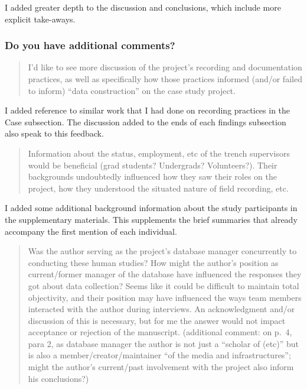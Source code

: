 \documentclass[
]{article}
\begin{document}
I added greater depth to the discussion and conclusions, which include
more explicit take-aways.

\subsubsection{Do you have additional
comments?}\label{do-you-have-additional-comments-2}

\begin{quote}
I'd like to see more discussion of the project's recording and
documentation practices, as well as specifically how those practices
informed (and/or failed to inform) ``data construction'' on the case
study project.
\end{quote}

I added reference to similar work that I had done on recording practices
in the Case subsection. The discussion added to the ends of each
findings subsection also speak to this feedback.

\begin{quote}
Information about the status, employment, etc of the trench supervisors
would be beneficial (grad students? Undergrads? Volunteers?). Their
backgrounds undoubtedly influenced how they saw their roles on the
project, how they understood the situated nature of field recording,
etc.
\end{quote}

I added some additional background information about the study
participants in the supplementary materials. This supplements the brief
summaries that already accompany the first mention of each individual.

\begin{quote}
Was the author serving as the project's database manager concurrently to
conducting these human studies? How might the author's position as
current/former manager of the database have influenced the responses
they got about data collection? Seems like it could be difficult to
maintain total objectivity, and their position may have influenced the
ways team members interacted with the author during interviews. An
acknowledgment and/or discussion of this is necessary, but for me the
answer would not impact acceptance or rejection of the manuscript.
(additional comment: on p.~4, para 2, as database manager the author is
not just a ``scholar of (etc)'' but is also a member/creator/maintainer
``of the media and infrastructures''; might the author's current/past
involvement with the project also inform his conclusions?)
\end{quote}
\end{document}
